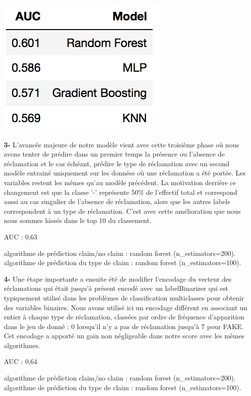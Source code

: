 \begin{center}
\includegraphics[scale=0.5]{assets/auc1} 
\end{center}

\textbf{3-} L'avancée majeure de notre modèle vient avec cette troisième phase où nous avons
tenter de prédire dans un premier temps la présence ou l'absence de réclamation et le cas 
échéant, prédire le type de réclamation avec un second modèle entrainé uniquement sur les
données où une réclamation a été portée. Les variables restent les mêmes qu'au modèle
précédent. La motivation derrière ce changement est que la classe '-' représente 50\%
de l'effectif total et correspond aussi au cas singulier de l'absence de réclamation, 
alors que les autres labels correspondent à un type de réclamation.
C'est avec cette amélioration que nous nous sommes hissés dans le top 10 du classement.

AUC : 0,63

algorithme de prédiction claim/no claim : random forest (n_estimators=200). \\
algorithme de prédiction du type de claim : random forest (n_estimators=100).

\textbf{4-} Une étape importante a ensuite été de modifier l'encodage du vecteur des
réclamations qui était jusqu'à présent encodé avec un labelBinarizer qui est typiquement utilisé
dans les problèmes de classification multiclasses pour obtenir des variables binaires.
Nous avons utilisé ici un encodage différent en associant un entier à chaque type de
réclamation, classées par ordre de fréquence d'apparition dans le jeu de donné : 0 lorsqu'il
n'y a pas de réclamation jusqu'à 7 pour FAKE. Cet encodage a apporté un gain non négligeable
dans notre score avec les mêmes algorithmes.

AUC : 0,64

algorithme de prédiction claim/no claim : random forest (n_estimators=200). \\
algorithme de prédiction du type de claim : random forest (n_estimators=100).

